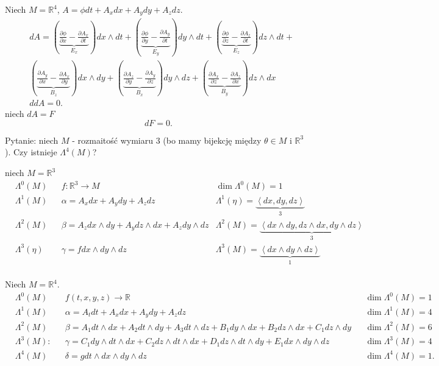 \documentclass[../main.tex]{subfiles}
\begin{document}
Niech $M = \mathbb{R}^4$, $A = \phi dt + A_x dx + A_y dy + A_z dz$.
\begin{align*}
    &dA = \left( \underbrace{\frac{\partial \phi}{\partial x} - \frac{\partial A_x}{\partial t}}_{E_x}  \right) dx\land dt + \left( \underbrace{\frac{\partial \phi}{\partial y} - \frac{\partial A_y}{\partial t}}_{E_y}  \right) dy\land dt + \left( \underbrace{\frac{\partial \phi}{\partial z}  - \frac{\partial A_z}{\partial t}}_{E_z} \right) dz\land dt+\\
    &\left( \underbrace{\frac{\partial A_y}{\partial x} - \frac{\partial A_x}{\partial y} }_{B_z} \right) dx\land dy + \left( \underbrace{\frac{\partial A_z}{\partial y} - \frac{\partial A_y}{\partial z}}_{B_x}  \right) dy\land dz + \left( \underbrace{\frac{\partial A_x}{\partial z} - \frac{\partial A_z}{\partial x}}_{B_y}  \right) dz\land dx\\
    &ddA = 0
.\end{align*}
niech $dA = F$
\[
dF = 0
.\]

Pytanie: niech $M$ - rozmaitość wymiaru $3$ (bo mamy bijekcję między $\theta\in M$ i $\mathbb{R}^3$ ). Czy istnieje $\Lambda^4(M)$?

niech $M = \mathbb{R}^3$
\begin{align*}
    &\Lambda^0(M) &&f: \mathbb{R}^3\to M &\dim \Lambda^0(M) = 1\\
    &\Lambda^1(M) &&\alpha = A_xdx + A_ydy + A_zdz &\Lambda^1(\eta) = \underbrace{\left<dx,dy,dz \right>}_{3}\\
    &\Lambda^2(M) &&\beta = A_zdx\land dy + A_ydz\land dx + A_z dy \land dz & \Lambda^2(M) = \underbrace{\left<dx\land dy, dz\land dx, dy\land dz \right>}_{3}\\
    &\Lambda^3(\eta) &&\gamma = f dx\land dy \land dz & \Lambda^3(M) = \underbrace{\left<dx\land dy\land dz \right>}_{1}\\
\end{align*}

Niech $M = \mathbb{R}^4$.
\begin{align*}
    &\Lambda^0(M) &&f(t,x,y,z) \to \mathbb{R} &&\dim \Lambda^0(M) =1\\
    &\Lambda^1(M) &&\alpha = A_t dt + A_xdx + A_ydy + A_zdz &&\dim \Lambda^1(M) = 4\\
    &\Lambda^2(M) &&\beta = A_1 dt\land dx+A_2dt\land dy + A_3dt\land dz + B_1dy\land dx + B_2 dz\land dx + C_1dz\land dy &&\dim \Lambda^2(M) = 6\\
    &\Lambda^3(M): &&\gamma = C_1dy\land dt\land dx + C_2dz\land dt\land dx + D_1dz\land dt\land dy + E_1dx\land dy\land dz &&\dim \Lambda^3(M) = 4\\
    &\Lambda^4(M) &&\delta = gdt\land dx\land dy\land dz && \dim\Lambda^4(M) = 1
.\end{align*}
\end{document}
